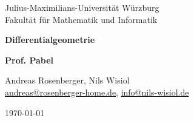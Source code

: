 \begin{titlepage}
  Julius-Maximilians-Universität Würzburg\\
  Fakultät für Mathematik und Informatik
  
  \vspace{3cm}
  
  \begin{center}
   \LARGE\textbf{Differentialgeometrie}
  \end{center}
  
  \vspace{0cm}
  
  \begin{center}
   \huge\textbf{Prof. Pabel}
  \end{center}
  
  \vspace{1cm}
  
  \begin{center}
   \Large Andreas Rosenberger, Nils Wisiol \\
   \footnotesize \href{mailto:andreas@rosenberger-home.de}{andreas@rosenberger-home.de}, \href{mailto:info@nils-wisiol.de}{info@nils-wisiol.de}
  \end{center}
  
  \vspace{0cm}
  
  \begin{center}
   \Large \today
  \end{center}
  
  
\end{titlepage}
